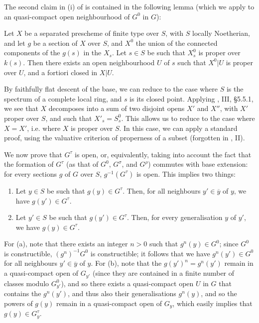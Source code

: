 The second claim in (i) of  is contained in the following lemma (which we apply to an quasi-compact open neighbourhood of $G^0$ in $G$):


\begin{lemma}\label{fga3.vi-1-lemma-1.3}
    Let $X$ be a separated prescheme of finite type over $S$, with $S$ locally Noetherian, and let $g$ be a section of $X$ over $S$, and $X^0$ the union of the connected components of the $g(s)$ in the $X_s$.
    Let $s\in S$ be such that $X_s^0$ is proper over $k(s)$.
    Then there exists an open neighbourhood $U$ of $s$ such that $X^0|U$ is proper over $U$, and a fortiori closed in $X|U$.
\end{lemma}

\begin{cproof}
    By faithfully flat descent of the base, we can reduce to the case where $S$ is the spectrum of a complete local ring, and $s$ is its closed point.
    Applying \cite{GD1960}, III, §5.5.1, we see that $X$ decomposes into a sum of two disjoint opens $X'$ and $X''$, with $X'$ proper over $S$, and such that $X'_s=S_s^0$.
    This allows us to reduce to the case where $X=X'$, i.e. where $X$ is proper over $S$.
    In this case, we can apply a standard proof, using the valuative criterion of properness of a subset (forgotten in \cite{GD1960}, II).
\end{cproof}


We now prove that $G^\tau$ is open, or, equivalently, taking into account the fact that the formation of $G^\tau$ (as that of $G^0$, $G^\sigma$, and $G^\rho$) commutes with base extension: for every sections $g$ of $G$ over $S$, $g^{-1}(G^\tau)$ is open.
This implies two things:

\begin{enumerate}[label=\alph*.]
    \item Let $y\in S$ be such that $g(y)\in G^\tau$.
          Then, for all neighbours $y'\in\overline{y}$ of $y$, we have $g(y')\in G^\tau$.
    \item Let $y'\in S$ be such that $g(y')\in G^\tau$.
          Then, for every generalisation $y$ of $y'$, we have $g(y)\in G^\tau$.
\end{enumerate}

For (a), note that there exists an integer $n>0$ such that $g^n(y)\in G^0$; since $G^0$ is constructible, $(g^n)^{-1}G^0$ is constructible;
it follows that we have $g^n(y')\in G^0$ for all neighbours $y'\in\overline{y}$ of $y$.
For (b), note that the $g(y')^n=g^n(y')$ remain in a quasi-compact open of $G_{y'}$ (since they are contained in a finite number of classes modulo $G_{y'}^0$), and so there exists a quasi-compact open $U$ in $G$ that contains the $g^n(y')$, and thus also their generalisations $g^n(y)$, and so the powers of $g(y)$ remain in a quasi-compact open of $G_y$, which easily implies that $g(y)\in G_y^\tau$.


